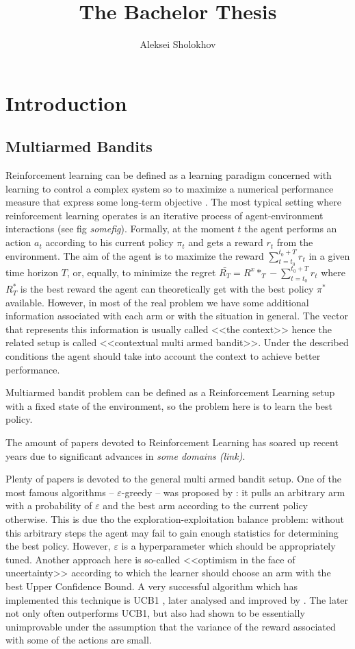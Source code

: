 \documentclass[a4paper]{article}
\author{Aleksei Sholokhov}
\title{The Bachelor Thesis}
\begin{document}
\maketitle

\section{Introduction}
\subsection{Multiarmed Bandits}
Reinforcement learning can be defined as a learning paradigm concerned with learning to control a complex system so to maximize a numerical performance measure that express some long-term objective \cite{Szepesvari2010}. The most typical setting where reinforcement learning operates is an iterative process of agent-environment interactions (see fig \textit{somefig}). Formally, at the moment $t$ the agent performs an action $a_t$ according to his current policy $\pi_t$ and gets a reward $r_t$ from the environment. The aim of the agent is to maximize the reward $\sum_{t = t_0}^{t_0 + T}r_t$ in a given time horizon $T$, or, equally, to minimize the regret $\bar{R_T} = R^x*_T - \sum_{t = t_0}^{t_0 + T}r_t$ where $R^*_T$ is the best reward the agent can theoretically get with the best policy $\pi^*$ available. However, in most of the real problem we have some additional information associated with each arm or with the situation in general. The vector that represents this information is usually called <<the context>> hence the related setup is called <<contextual multi armed bandit>>. Under the described conditions the agent should take into account the context to achieve better performance. 
 
Multiarmed bandit problem can be defined as a Reinforcement Learning setup with a fixed state of the environment, so the problem here is to learn the best policy. 

The amount of papers devoted to Reinforcement Learning has soared up recent years due to significant advances in \textit{some domains (link)}.

Plenty of papers is devoted to the general multi armed bandit setup. One of the most famous algorithms -- $\varepsilon$-greedy -- was proposed by \cite{Auer2002}: it pulls an arbitrary arm with a probability of $\varepsilon$ and the best arm according to the current policy otherwise. This is due tho the exploration-exploitation balance problem: without this arbitrary steps the agent may fail to gain enough statistics for determining the best policy. However, $\varepsilon$ is a hyperparameter which should be appropriately tuned. Another approach here is so-called <<optimism in the face of uncertainty>> \cite{Lai1985} according to which the learner should choose an arm with the best Upper Confidence Bound. A very successful algorithm which has implemented this technique is UCB1 \cite{Auer2002}, later analysed and improved by \cite{Audibert2009}. The later not only often outperforms UCB1, but also had shown to be essentially unimprovable under the assumption that the variance of the reward associated with some of the actions are small.
\end{document}
